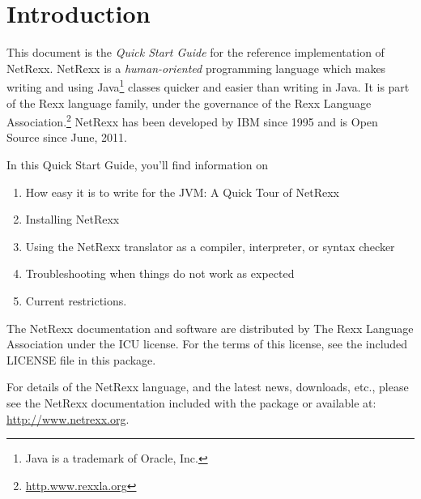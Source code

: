 \chapter{Introduction}
This document is the \emph{Quick Start Guide} for the reference implementation of
NetRexx. NetRexx is a \emph{human-oriented} programming language which makes
writing and using Java\footnote{Java is a trademark of Oracle, Inc.}
classes quicker and easier than writing in Java. It is part of the Rexx
language family, under the governance of the Rexx Language
Association.\footnote{\url{http.www.rexxla.org}} NetRexx has been
developed by IBM since 1995 and is Open Source
since June, 2011.

In this Quick Start Guide, you’ll find information on
\begin{enumerate} 
\item How easy it is to write for the JVM: A Quick Tour of NetRexx
\item Installing NetRexx 
\item Using the NetRexx translator as a compiler, interpreter, or
  syntax checker 
\item Troubleshooting when things do not work as expected
\item Current restrictions.
\end{enumerate} 
The NetRexx documentation and software are distributed
by The Rexx Language Association under the \textsc{ICU} license. For
the terms of this license, see the included \textsc{LICENSE} file in
this package.

For details of the NetRexx language, and the latest news, downloads,
etc., please see the NetRexx documentation included with the package
or available at: \url{http://www.netrexx.org}.


